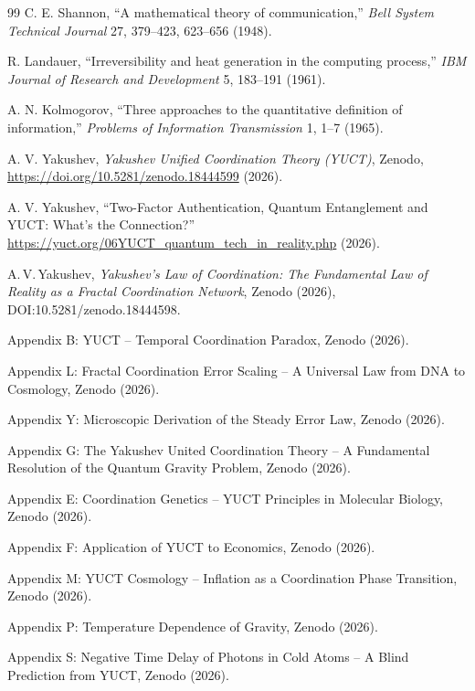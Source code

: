 \documentclass[12pt,a4paper]{article}
\theoremstyle{remark}
\begin{document}
	\begin{thebibliography}{99}
		C. E. Shannon, ``A mathematical theory of communication,'' \emph{Bell System Technical Journal} 27, 379–423, 623–656 (1948).
		
		R. Landauer, ``Irreversibility and heat generation in the computing process,'' \emph{IBM Journal of Research and Development} 5, 183–191 (1961).
		
		A. N. Kolmogorov, ``Three approaches to the quantitative definition of information,'' \emph{Problems of Information Transmission} 1, 1–7 (1965).
		
		A. V. Yakushev, \emph{Yakushev Unified Coordination Theory (YUCT)}, Zenodo, \url{https://doi.org/10.5281/zenodo.18444599} (2026).
		
		A. V. Yakushev, ``Two-Factor Authentication, Quantum Entanglement and YUCT: What's the Connection?'' \url{https://yuct.org/06YUCT_quantum_tech_in_reality.php} (2026).
		
		A.\,V.\,Yakushev, \emph{Yakushev's Law of Coordination: The Fundamental Law
			of Reality as a Fractal Coordination Network}, Zenodo (2026),
		DOI:10.5281/zenodo.18444598.
		
		Appendix B: YUCT – Temporal Coordination Paradox, Zenodo (2026).
		
		Appendix L: Fractal Coordination Error Scaling – A Universal Law from DNA to Cosmology, Zenodo (2026).
		
		Appendix Y: Microscopic Derivation of the Steady Error Law, Zenodo (2026).
		
		Appendix G: The Yakushev United Coordination Theory – A Fundamental Resolution of the Quantum Gravity Problem, Zenodo (2026).
		
		Appendix E: Coordination Genetics – YUCT Principles in Molecular Biology, Zenodo (2026).
		
		Appendix F: Application of YUCT to Economics, Zenodo (2026).
		
		Appendix M: YUCT Cosmology – Inflation as a Coordination Phase Transition, Zenodo (2026).
		
		Appendix P: Temperature Dependence of Gravity, Zenodo (2026).
		
		Appendix S: Negative Time Delay of Photons in Cold Atoms – A Blind Prediction from YUCT, Zenodo (2026).
		

\end{thebibliography}
\end{document}
